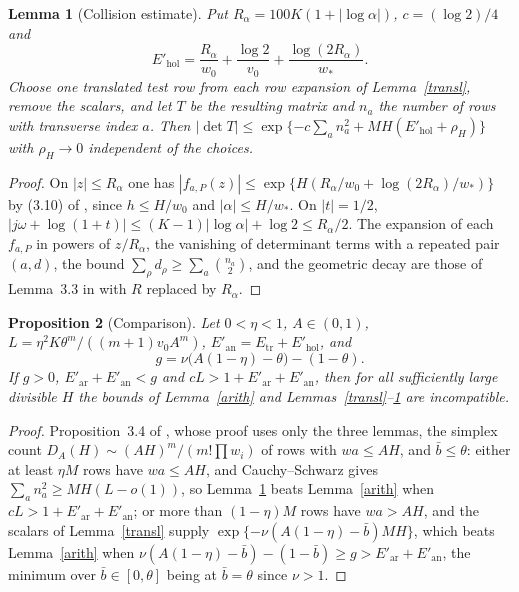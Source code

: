 \documentclass[11pt]{amsart}
\newtheorem{lemma}{Lemma}[section]
\newtheorem{proposition}[lemma]{Proposition}
\begin{document}
\begin{lemma}[Collision estimate]\label{coll}
Put $R_\alpha=100K(1+|\log\alpha|)$, $c=(\log2)/4$ and
\[
E'_{\mathrm{hol}}=\frac{R_\alpha}{w_0}+\frac{\log2}{v_0}+\frac{\log(2R_\alpha)}{w_*}.
\]
Choose one translated test row from each row expansion of Lemma~\ref{transl}, remove the scalars, and let $T$ be the resulting matrix and $n_a$ the number of rows with transverse index $a$. Then $|\det T|\le\exp\{-c\sum_an_a^2+MH(E'_{\mathrm{hol}}+\rho_H)\}$ with $\rho_H\to0$ independent of the choices.
\end{lemma}

\begin{proof}
On $|z|\le R_\alpha$ one has $|f_{a,P}(z)|\le\exp\{H(R_\alpha/w_0+\log(2R_\alpha)/w_*)\}$ by (3.10) of \cite{OAI}, since $h\le H/w_0$ and $|\alpha|\le H/w_*$. On $|t|=1/2$, $|j\omega+\log(1+t)|\le(K-1)|\log\alpha|+\log2\le R_\alpha/2$. The expansion of each $f_{a,P}$ in powers of $z/R_\alpha$, the vanishing of determinant terms with a repeated pair $(a,d)$, the bound $\sum_\rho d_\rho\ge\sum_a\binom{n_a}{2}$, and the geometric decay are those of Lemma~3.3 in \cite{OAI} with $R$ replaced by $R_\alpha$.
\end{proof}

\begin{proposition}[Comparison]\label{comp}
Let $0<\eta<1$, $A\in(0,1)$, $L=\eta^2K\theta^m/((m+1)v_0A^m)$, $E'_{\mathrm{an}}=E_{\mathrm{tr}}+E'_{\mathrm{hol}}$, and
\[
g=\nu\bigl(A(1-\eta)-\theta\bigr)-(1-\theta).
\]
If $g>0$, $E'_{\mathrm{ar}}+E'_{\mathrm{an}}<g$ and $cL>1+E'_{\mathrm{ar}}+E'_{\mathrm{an}}$, then for all sufficiently large divisible $H$ the bounds of Lemma~\ref{arith} and Lemmas~\ref{transl}--\ref{coll} are incompatible.
\end{proposition}

\begin{proof}
Proposition~3.4 of \cite{OAI}, whose proof uses only the three lemmas, the simplex count $D_A(H)\sim(AH)^m/(m!\prod w_i)$ of rows with $wa\le AH$, and $\bar b\le\theta$: either at least $\eta M$ rows have $wa\le AH$, and Cauchy--Schwarz gives $\sum_an_a^2\ge MH(L-o(1))$, so Lemma~\ref{coll} beats Lemma~\ref{arith} when $cL>1+E'_{\mathrm{ar}}+E'_{\mathrm{an}}$; or more than $(1-\eta)M$ rows have $wa>AH$, and the scalars of Lemma~\ref{transl} supply $\exp\{-\nu(A(1-\eta)-\bar b)MH\}$, which beats Lemma~\ref{arith} when $\nu(A(1-\eta)-\bar b)-(1-\bar b)\ge g>E'_{\mathrm{ar}}+E'_{\mathrm{an}}$, the minimum over $\bar b\in[0,\theta]$ being at $\bar b=\theta$ since $\nu>1$.
\end{proof}
\end{document}
